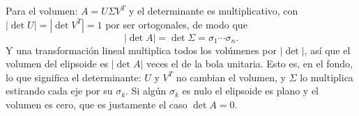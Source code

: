 \documentclass[11pt,a4paper]{article}
\begin{document}
Para el volumen: $A=U\Sigma V^T$ y el determinante es multiplicativo, con
$|\det U|=|\det V^T|=1$ por ser ortogonales, de modo que
\[
|\det A|=\det\Sigma=\sigma_1\cdots\sigma_n .
\]
Y una transformación lineal multiplica todos los volúmenes por $|\det|$, así que
el volumen del elipsoide es $|\det A|$ veces el de la bola unitaria. Esto es, en
el fondo, lo que significa el determinante: $U$ y $V^T$ no cambian el volumen, y
$\Sigma$ lo multiplica estirando cada eje por su $\sigma_k$. Si algún $\sigma_k$
es nulo el elipsoide es plano y el volumen es cero, que es justamente el caso
$\det A=0$.
\end{document}
